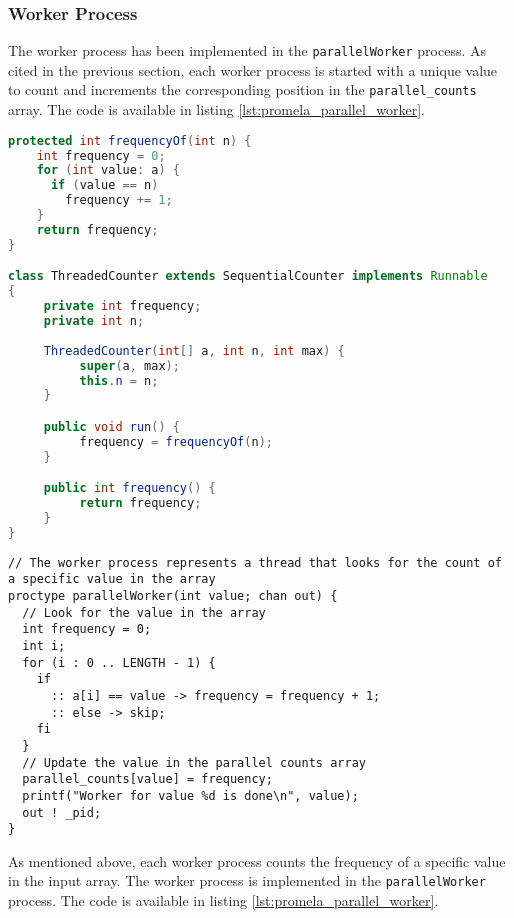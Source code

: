 \documentclass[a4paper, 11pt]{article}
\begin{document}
\subsubsection{Worker Process}

The worker process has been implemented in the \texttt{parallelWorker} process. As cited in the previous section, each worker process is started with a unique value to count and increments the corresponding position in the \texttt{parallel\_counts} array. The code is available in listing \ref{lst:promela_parallel_worker}.

\begin{minipage}[t]{0.45\textwidth}
	\begin{lstlisting}[language=Java, caption={Java parallel worker thread implementation leveraging Threads}, captionpos=b, label={lst:java_parallel_worker}]
protected int frequencyOf(int n) {
    int frequency = 0;
    for (int value: a) {
      if (value == n)
        frequency += 1;
    }
    return frequency;
}

class ThreadedCounter extends SequentialCounter implements Runnable
{
	 private int frequency;
	 private int n;
	 
	 ThreadedCounter(int[] a, int n, int max) {
		  super(a, max);
		  this.n = n;
	 }

	 public void run() {
		  frequency = frequencyOf(n);
	 }

	 public int frequency() {
		  return frequency;
	 }
}
  \end{lstlisting}
\end{minipage}\hfill
\begin{minipage}[t]{0.45\textwidth}
	\begin{lstlisting}[language=Promela, caption={ProMeLa parallel frequency counter - worker process}, captionpos=b, breaklines=true, label={lst:promela_parallel_worker}]
// The worker process represents a thread that looks for the count of a specific value in the array
proctype parallelWorker(int value; chan out) {
  // Look for the value in the array
  int frequency = 0;
  int i;
  for (i : 0 .. LENGTH - 1) {
    if
      :: a[i] == value -> frequency = frequency + 1;
      :: else -> skip;
    fi
  }
  // Update the value in the parallel counts array
  parallel_counts[value] = frequency;
  printf("Worker for value %d is done\n", value);
  out ! _pid;
}
  \end{lstlisting}
\end{minipage}

As mentioned above, each worker process counts the frequency of a specific value in the input array. The worker process is implemented in the \texttt{parallelWorker} process. The code is available in listing \ref{lst:promela_parallel_worker}.
\end{document}
